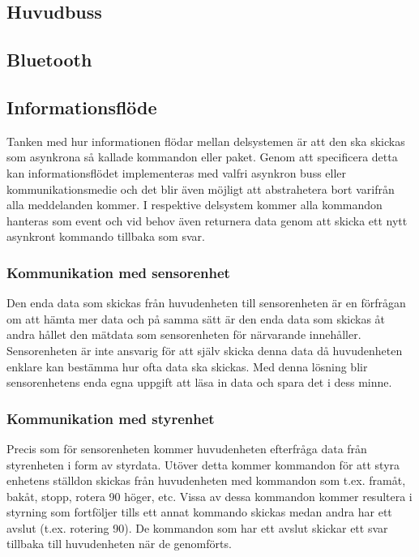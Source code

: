 \documentclass{article}
\begin{document}
\subsection{Huvudbuss}

\subsection{Bluetooth}

\subsection{Informationsflöde}
Tanken med hur informationen flödar mellan delsystemen är att den ska skickas som asynkrona så kallade kommandon eller paket. Genom att specificera detta kan informationsflödet implementeras med valfri asynkron buss eller kommunikationsmedie och det blir även möjligt att abstrahetera bort varifrån alla meddelanden kommer. I respektive delsystem kommer alla kommandon hanteras som event och vid behov även returnera data genom att skicka ett nytt asynkront kommando tillbaka som svar.

\subsubsection{Kommunikation med sensorenhet}
Den enda data som skickas från huvudenheten till sensorenheten är en förfrågan om att hämta mer data och på samma sätt är den enda data som skickas åt andra hållet den mätdata som sensorenheten för närvarande innehåller. Sensorenheten är inte ansvarig för att själv skicka denna data då huvudenheten enklare kan bestämma hur ofta data ska skickas. Med denna lösning blir sensorenhetens enda egna uppgift att läsa in data och spara det i dess minne.

\subsubsection{Kommunikation med styrenhet}
Precis som för sensorenheten kommer huvudenheten efterfråga data från styrenheten i form av styrdata. Utöver detta kommer kommandon för att styra enhetens ställdon skickas från huvudenheten med kommandon som t.ex. framåt, bakåt, stopp, rotera 90{\textdegree} höger, etc. Vissa av dessa kommandon kommer resultera i styrning som fortföljer tills ett annat kommando skickas medan andra har ett avslut (t.ex. rotering 90{\textdegree}). De kommandon som har ett avslut skickar ett svar tillbaka till huvudenheten när de genomförts.
\end{document}
